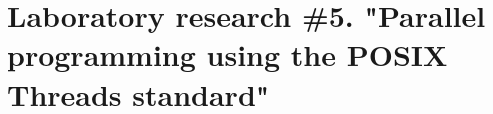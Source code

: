 { %
	\section{Laboratory research \#5. "Parallel programming using the POSIX Threads standard"{}}
	
	
	
}
